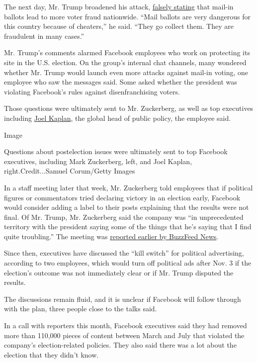 The next day, Mr. Trump broadened his attack,
\href{https://www.nytimes3xbfgragh.onion/article/mail-in-voting-explained.html}{falsely
stating} that mail-in ballots lead to more voter fraud nationwide.
``Mail ballots are very dangerous for this country because of
cheaters,'' he said. ``They go collect them. They are fraudulent in many
cases.''

Mr. Trump's comments alarmed Facebook employees who work on protecting
its site in the U.S. election. On the group's internal chat channels,
many wondered whether Mr. Trump would launch even more attacks against
mail-in voting, one employee who saw the messages said. Some asked
whether the president was violating Facebook's rules against
disenfranchising voters.

Those questions were ultimately sent to Mr. Zuckerberg, as well as top
executives including
\href{https://www.nytimes3xbfgragh.onion/2016/05/18/technology/facebook-moves-to-repair-its-fractured-relationship-with-the-right.html}{Joel
Kaplan}, the global head of public policy, the employee said.

Image

Questions about postelection issues were ultimately sent to top Facebook
executives, including Mark Zuckerberg, left, and Joel Kaplan,
right.Credit...Samuel Corum/Getty Images

In a staff meeting later that week, Mr. Zuckerberg told employees that
if political figures or commentators tried declaring victory in an
election early, Facebook would consider adding a label to their posts
explaining that the results were not final. Of Mr. Trump, Mr. Zuckerberg
said the company was ``in unprecedented territory with the president
saying some of the things that he's saying that I find quite
troubling.'' The meeting was
\href{https://www.buzzfeednews.com/article/craigsilverman/facebook-zuckerberg-what-if-trump-disputes-election-results}{reported
earlier by BuzzFeed News}.

Since then, executives have discussed the ``kill switch'' for political
advertising, according to two employees, which would turn off political
ads after Nov. 3 if the election's outcome was not immediately clear or
if Mr. Trump disputed the results.

The discussions remain fluid, and it is unclear if Facebook will follow
through with the plan, three people close to the talks said.

In a call with reporters this month, Facebook executives said they had
removed more than 110,000 pieces of content between March and July that
violated the company's election-related policies. They also said there
was a lot about the election that they didn't know.

